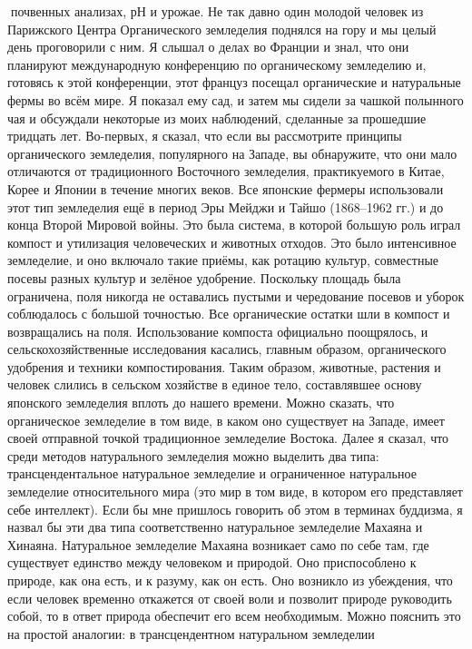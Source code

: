 \documentclass[a4paper]{book}
\begin{document}
почвенных анализах, рН и урожае.
Не так давно один молодой человек из Парижского Центра Органического земледелия
поднялся на гору и мы целый день проговорили с ним. Я слышал о делах во Франции и знал,
что они планируют международную конференцию по органическому земледелию и, готовясь
к этой конференции, этот француз посещал органические и натуральные фермы во всём
мире. Я показал ему сад, и затем мы сидели за чашкой полынного чая и обсуждали
некоторые из моих наблюдений, сделанные за прошедшие тридцать лет.
Во-первых, я сказал, что если вы рассмотрите принципы органического земледелия,
популярного на Западе, вы обнаружите, что они мало отличаются от традиционного
Восточного земледелия, практикуемого в Китае, Корее и Японии в течение многих веков. Все
японские фермеры использовали этот тип земледелия ещё в период Эры Мейджи и Тайшо
(1868–1962 гг.) и до конца Второй Мировой войны. Это была система, в которой большую
роль играл компост и утилизация человеческих и животных отходов. Это было интенсивное
земледелие, и оно включало такие приёмы, как ротацию культур, совместные посевы разных
культур и зелёное удобрение. Поскольку площадь была ограничена, поля никогда не
оставались пустыми и чередование посевов и уборок соблюдалось с большой точностью. Все
органические остатки шли в компост и возвращались на поля. Использование компоста
официально поощрялось, и сельскохозяйственные исследования касались, главным образом,
органического удобрения и техники компостирования.
Таким образом, животные, растения и человек слились в сельском хозяйстве в единое
тело, составлявшее основу японского земледелия вплоть до нашего времени. Можно сказать,
что органическое земледелие в том виде, в каком оно существует на Западе, имеет своей
отправной точкой традиционное земледелие Востока.
Далее я сказал, что среди методов натурального земледелия можно выделить два типа:
трансцендентальное натуральное земледелие и ограниченное натуральное земледелие
относительного мира (это мир в том виде, в котором его представляет себе интеллект). Если
бы мне пришлось говорить об этом в терминах буддизма, я назвал бы эти два типа
соответственно натуральное земледелие Махаяна и Хинаяна.
Натуральное земледелие Махаяна возникает само по себе там, где существует единство
между человеком и природой. Оно приспособлено к природе, как она есть, и к разуму, как он
есть. Оно возникло из убеждения, что если человек временно откажется от своей воли и
позволит природе руководить собой, то в ответ природа обеспечит его всем необходимым.
Можно пояснить это на простой аналогии: в трансцендентном натуральном земледелии
\end{document}
